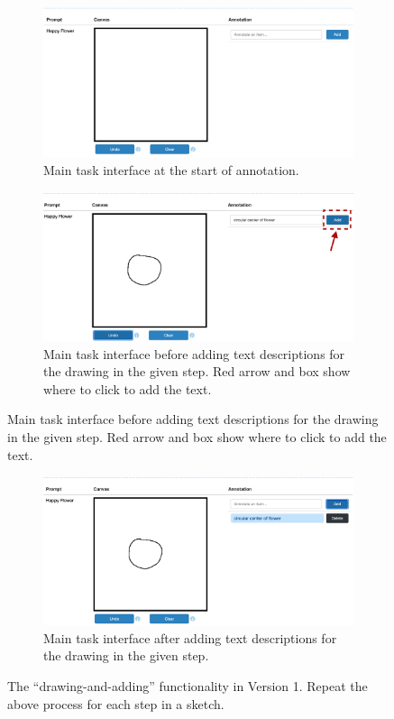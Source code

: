 \begin{figure}[!htb]
\begin{subfigure}{\textwidth}
    \centering
    \includegraphics[width=.8\linewidth]{data_collection/v1_empty_table.png}  
    \caption{Main task interface at the start of annotation.}
    \label{v1.main_task.1.a}
\end{subfigure}
\newline
\begin{subfigure}{\textwidth}
    \centering
    \includegraphics[width=.8\linewidth]{data_collection/v1_before_enter_text.png}  
    \caption{Main task interface before adding text descriptions for the drawing in the given step. Red arrow and box show where to click to add the text.}
    \label{v1.main_task.1.b}
\end{subfigure}
\end{figure}

\begin{figure}[!htb]
\ContinuedFloat
\begin{subfigure}{\textwidth}
    \centering
    \includegraphics[width=.8\linewidth]{data_collection/v1_after_enter_text.png}  
    \caption{Main task interface after adding text descriptions for the drawing in the given step.}
    \label{v1.main_task.1.c}
\end{subfigure}
\caption{The ``drawing-and-adding'' functionality in Version 1. Repeat the above process for each step in a sketch.}
\label{v1.main_task.1}
\end{figure}

